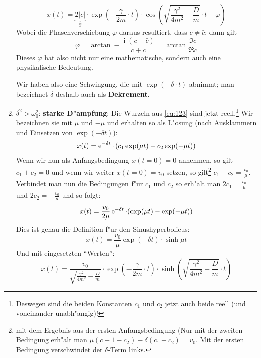\begin{enumerate}[F{a}ll I:]
\begin{equation}
      \label{eqn_schwache-daempfung}
\boxed{      x(t) = \underbrace{2|c|}_{\hat x} \cdot
      \exp(-{\frac{\gamma}{2m}} \cdot t) \cdot \cos (\sqrt{\frac{\gamma^2}{4m^2} -
        \frac{D}{m}} \cdot t + \varphi ) }
   \end{equation}
   Wobei die Phasenverschiebung $\varphi$ daraus resultiert, dass $c
   \neq \bar c$; dann gilt
   \begin{equation}
      \label{eq:126}
      \varphi = \arctan - \frac{\operatorname{i} (c - \bar c)}{c + \bar
        c} = \arctan \frac{\Im c}{\Re c}
   \end{equation}
Dieses $\varphi$ hat also nicht nur eine mathematische, sondern auch
eine physikalische Bedeutung.

Wir haben also eine Schwingung, die mit $\exp ( -\delta \cdot t )$
abnimmt; man bezeichnet $\delta$ deshalb auch als \textbf{Dekrement}.



\item $\delta^2 > \omega_0^2$: \textbf{starke D"ampfung}: Die Wurzeln
   aus \eqref{eq:123} sind jetzt reell.\footnote{Deswegen sind die
     beiden Konstanten $c_1$ und $c_2$ jetzt auch beide reell (und
     voneinander unabh"angig)!} Wir bezeichnen sie mit $\mu$ und $-\mu$
   und erhalten so als L"osung (nach Ausklammern und Einsetzen von
   $\exp( -\delta t)$):
   \begin{equation}
      \label{eq:127}
      x(t) = \operatorname{e}^{-\delta t} \cdot \left ( c_1\exp( \mu t )+ c_2 \exp (-\mu t) \right )
   \end{equation}
   Wenn wir nun als Anfangsbedingung $x(t = 0) = 0$ annehmen, so gilt
   $c_1 + c_2 = 0$ und wenn wir weiter $\dot x(t = 0) = v_0$ setzen, so
   gilt\footnote{mit dem Ergebnis aus der ersten Anfangsbedingung (Nur
   mit der zweiten Bedingung erh"alt man $\mu(c-1 - c_2) -
   \delta(c_1+c_2) = v_0$. Mit der ersten Bedingung verschwindet der
   $\delta$-Term links.}
   $c_1 - c_2 = \frac{v_0}{\mu}$. Verbindet man nun die Bedingungen
   f"ur $c_1$ und $c_2$ so erh"alt man $2c_1 = \frac{v_0}{\mu}$ und
   $2c_2 = -\frac{v_0}{\mu}$ und so folgt:
   \begin{equation}
      \label{eq:128}
      x(t) = \frac{v_0}{2 \mu} \operatorname{e}^{-\delta t} \cdot ( \exp(\mu t) - \exp(-\mu t))
   \end{equation}
   Dies ist genau die Definition f"ur den Sinushyperbolicus:
   \begin{equation}
      \label{eqn_starke-daempfung}
\boxed{      x(t) = \frac{v_0}{\mu} \exp (- \delta t) \cdot \sinh \mu
  t }
   \end{equation}
   Und mit eingesetzten "`Werten"':
   \begin{equation*}
      x(t) = \frac{v_0}{\sqrt{\frac{\gamma^2}{4m^2} -
        \frac{D}{m}}} \cdot \exp\left({-{\frac{\gamma}{2m}}\cdot t}\right) \cdot \sinh \left( \sqrt{\frac{\gamma^2}{4m^2} -
        \frac{D}{m}} \cdot t \right)
   \end{equation*}


\end{enumerate}
